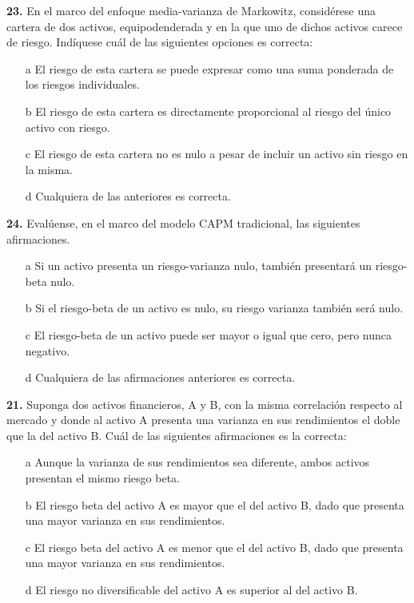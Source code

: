 \documentclass{nuevotema}
\begin{document}
\textbf{23.} En el marco del enfoque media-varianza de Markowitz, considérese una cartera de dos activos, equipodenderada y en la que uno de dichos activos carece de riesgo. Indíquese cuál de las siguientes opciones es correcta:
\begin{enumerate}
	\item[a] El riesgo de esta cartera se puede expresar como una suma ponderada de los riesgos individuales.
	\item[b] El riesgo de esta cartera es directamente proporcional al riesgo del único activo con riesgo.
	\item[c] El riesgo de esta cartera no es nulo a pesar de incluir un activo sin riesgo en la misma.
	\item[d] Cualquiera de las anteriores es correcta.
\end{enumerate}

\textbf{24.} Evalúense, en el marco del modelo CAPM tradicional, las siguientes afirmaciones.
\begin{enumerate}
	\item[a] Si un activo presenta un riesgo-varianza nulo, también presentará un riesgo-beta nulo.
	\item[b] Si el riesgo-beta de un activo es nulo, su riesgo varianza también será nulo.
	\item[c] El riesgo-beta de un activo puede ser mayor o igual que cero, pero nunca negativo.
	\item[d] Cualquiera de las afirmaciones anteriores es correcta. 
\end{enumerate}

\textbf{21.} Suponga dos activos financieros, A y B, con la misma correlación respecto al mercado y donde al activo A presenta una varianza en sus rendimientos el doble que la del activo B. Cuál de las siguientes afirmaciones es la correcta:
\begin{enumerate}
	\item[a] Aunque la varianza de sus rendimientos sea diferente, ambos activos presentan el mismo riesgo beta.
	\item[b] El riesgo beta del activo A es mayor que el del activo B, dado que presenta una mayor varianza en sus rendimientos.
	\item[c] El riesgo beta del activo A es menor que el del activo B, dado que presenta una mayor varianza en sus rendimientos. 
	\item[d] El riesgo no diversificable del activo A es superior al del activo B.
\end{enumerate}
\end{document}
